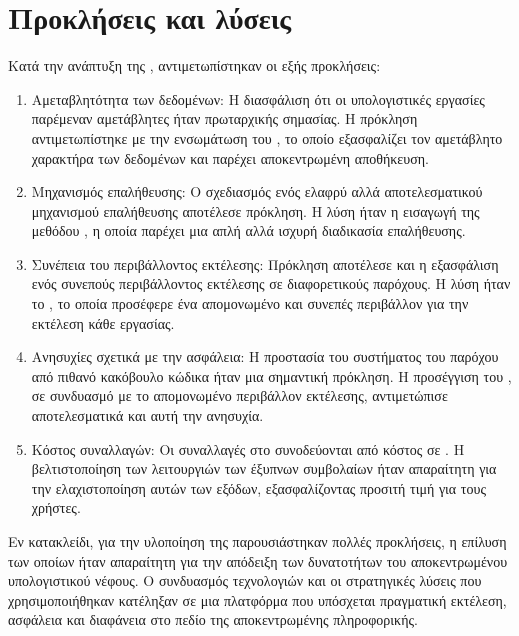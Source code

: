 \section{Προκλήσεις και λύσεις}
Κατά την ανάπτυξη της , αντιμετωπίστηκαν οι εξής προκλήσεις:
\begin{enumerate}
    \item Αμεταβλητότητα των δεδομένων: Η διασφάλιση ότι οι υπολογιστικές εργασίες παρέμεναν αμετάβλητες ήταν πρωταρχικής σημασίας. Η πρόκληση αντιμετωπίστηκε με την ενσωμάτωση του , το οποίο εξασφαλίζει τον αμετάβλητο χαρακτήρα των δεδομένων και παρέχει αποκεντρωμένη αποθήκευση.
    \item Μηχανισμός επαλήθευσης: Ο σχεδιασμός ενός ελαφρύ αλλά αποτελεσματικού μηχανισμού επαλήθευσης αποτέλεσε πρόκληση. Η λύση ήταν η εισαγωγή της μεθόδου , η οποία παρέχει μια απλή αλλά ισχυρή διαδικασία επαλήθευσης.
    \item Συνέπεια του περιβάλλοντος εκτέλεσης: Πρόκληση αποτέλεσε και η εξασφάλιση ενός συνεπούς περιβάλλοντος εκτέλεσης σε διαφορετικούς παρόχους. Η λύση ήταν το , το οποία προσέφερε ένα απομονωμένο και συνεπές περιβάλλον για την εκτέλεση κάθε εργασίας.
    \item Ανησυχίες σχετικά με την ασφάλεια: Η προστασία του συστήματος του παρόχου από πιθανό κακόβουλο κώδικα ήταν μια σημαντική πρόκληση. Η προσέγγιση του , σε συνδυασμό με το απομονωμένο περιβάλλον εκτέλεσης, αντιμετώπισε αποτελεσματικά και αυτή την ανησυχία.
    \item Κόστος συναλλαγών: Οι συναλλαγές στο  συνοδεύονται από κόστος σε . Η βελτιστοποίηση των λειτουργιών των έξυπνων συμβολαίων ήταν απαραίτητη για την ελαχιστοποίηση αυτών των εξόδων, εξασφαλίζοντας προσιτή τιμή για τους χρήστες.
\end{enumerate}

Εν κατακλείδι, για την υλοποίηση της  παρουσιάστηκαν πολλές προκλήσεις, η επίλυση των οποίων ήταν απαραίτητη για την απόδειξη των δυνατοτήτων του αποκεντρωμένου υπολογιστικού νέφους. Ο συνδυασμός τεχνολογιών και οι στρατηγικές λύσεις που χρησιμοποιήθηκαν κατέληξαν σε μια πλατφόρμα που υπόσχεται πραγματική εκτέλεση, ασφάλεια και διαφάνεια στο πεδίο της αποκεντρωμένης πληροφορικής.